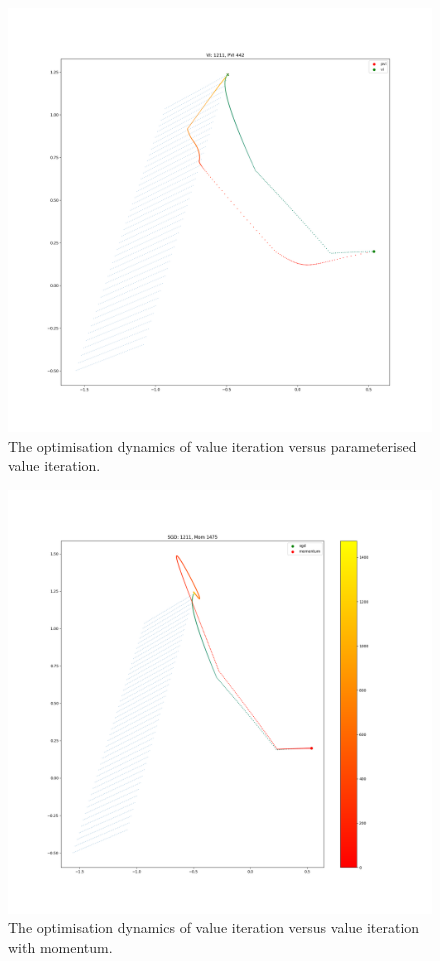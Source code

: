 \begin{figure}
\label{fig:param-compare-sgd}
\centering
\includegraphics[width=1.0\textwidth,height=0.5\textheight]{../../pictures/figures/vi-vs-pvi.png}
\caption{The optimisation dynamics of value iteration versus parameterised value iteration.}
\end{figure}

\begin{figure}
\label{fig:mom-compare-sgd}
\centering
\includegraphics[width=1.0\textwidth,height=0.5\textheight]{../../pictures/figures/vi_sgd-vs-vi_mom.png}
\caption{The optimisation dynamics of value iteration versus value iteration with momentum.}
\end{figure}

